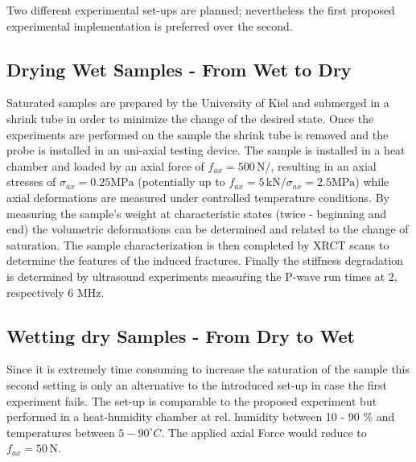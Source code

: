 Two different experimental set-ups are planned; nevertheless the first proposed experimental implementation is preferred over the second.

\subsection{Drying Wet Samples - From Wet to Dry}
Saturated samples are prepared by the University of Kiel and submerged in a shrink tube in order to minimize the change of the desired state. Once the experiments are performed on the sample the shrink tube is removed and the probe is installed in an uni-axial testing device. The sample is installed in a heat chamber and loaded by an axial force of $f_{ax} = 500 \, \text{N}$/, resulting in an axial stresses of $ \sigma_{ax} = 0.25 \text{MPa}$ (potentially up to $f_{ax} = 5 \, \text{kN}$/$ \sigma_{ax} = 2.5 \text{MPa}$) while axial deformations are measured under controlled temperature conditions. By measuring the sample's weight at characteristic states (twice - beginning and end) the volumetric deformations can be determined and related to the change of saturation. The sample characterization is then completed by XRCT scans to determine the features of the induced fractures. Finally the stiffness degradation is determined by ultrasound experiments measuŕing the P-wave run times at 2, respectively 6 MHz.

\subsection{Wetting dry Samples - From Dry to Wet}

Since it is extremely time consuming to increase the saturation of the sample this second setting is only an alternative to the introduced set-up in case the first experiment fails. The set-up is comparable to the proposed experiment but performed in a heat-humidity chamber at rel. humidity between 10 - 90 \% and temperatures between $5-90^\circ C$. The applied axial Force would reduce to $f_{ax} = 50 \, \text{N}$.